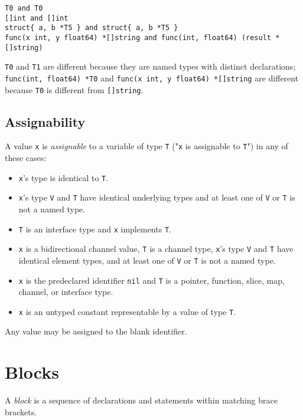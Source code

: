 \begin{Verbatim}[frame=single]
T0 and T0
[]int and []int
struct{ a, b *T5 } and struct{ a, b *T5 }
func(x int, y float64) *[]string and func(int, float64) (result *[]string)
\end{Verbatim}

\texttt{T0} and \texttt{T1} are different because they are named types
with distinct declarations; \texttt{func(int, float64) *T0} and
\texttt{func(x int, y float64) *{[}{]}string} are different because
\texttt{T0} is different from \texttt{{[}{]}string}.

\subsection*{Assignability}

A value \texttt{x} is \emph{assignable} to a variable of type \texttt{T}
("\texttt{x} is assignable to \texttt{T}") in any of these cases:

\begin{itemize}
\item
  \texttt{x}'s type is identical to \texttt{T}.
\item
  \texttt{x}'s type \texttt{V} and \texttt{T} have identical
  underlying types and at least one of \texttt{V} or
  \texttt{T} is not a named type.
\item
  \texttt{T} is an interface type and \texttt{x}
  implements \texttt{T}.
\item
  \texttt{x} is a bidirectional channel value, \texttt{T} is a channel
  type, \texttt{x}'s type \texttt{V} and \texttt{T} have identical
  element types, and at least one of \texttt{V} or \texttt{T} is not a
  named type.
\item
  \texttt{x} is the predeclared identifier \texttt{nil} and \texttt{T}
  is a pointer, function, slice, map, channel, or interface type.
\item
  \texttt{x} is an untyped constant representable
  by a value of type \texttt{T}.
\end{itemize}

Any value may be assigned to the blank identifier.

\section*{Blocks}

A \emph{block} is a sequence of declarations and statements within
matching brace brackets.

